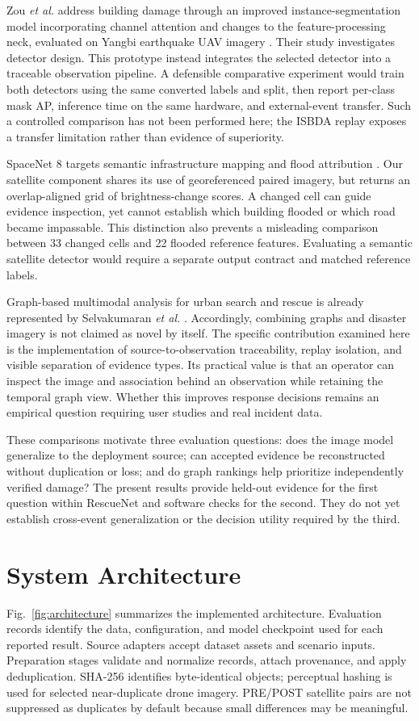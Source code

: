 \documentclass[conference]{IEEEtran}
\newcommand{\changed}[1]{{\color{blue}#1}}
\newcommand{\changed}[1]{#1}
\begin{document}
\changed{Zou \emph{et al.} address building damage through an improved instance-segmentation model incorporating channel attention and changes to the feature-processing neck, evaluated on Yangbi earthquake UAV imagery \cite{zou}. Their study investigates detector design. This prototype instead integrates the selected detector into a traceable observation pipeline. A defensible comparative experiment would train both detectors using the same converted labels and split, then report per-class mask AP, inference time on the same hardware, and external-event transfer. Such a controlled comparison has not been performed here; the ISBDA replay exposes a transfer limitation rather than evidence of superiority.}

\changed{SpaceNet 8 targets semantic infrastructure mapping and flood attribution \cite{spacenet}. Our satellite component shares its use of georeferenced paired imagery, but returns an overlap-aligned grid of brightness-change scores. A changed cell can guide evidence inspection, yet cannot establish which building flooded or which road became impassable. This distinction also prevents a misleading comparison between 33 changed cells and 22 flooded reference features. Evaluating a semantic satellite detector would require a separate output contract and matched reference labels.}

\changed{Graph-based multimodal analysis for urban search and rescue is already represented by Selvakumaran \emph{et al.} \cite{selva}. Accordingly, combining graphs and disaster imagery is not claimed as novel by itself. The specific contribution examined here is the implementation of source-to-observation traceability, replay isolation, and visible separation of evidence types. Its practical value is that an operator can inspect the image and association behind an observation while retaining the temporal graph view. Whether this improves response decisions remains an empirical question requiring user studies and real incident data.}

\changed{These comparisons motivate three evaluation questions: does the image model generalize to the deployment source; can accepted evidence be reconstructed without duplication or loss; and do graph rankings help prioritize independently verified damage? The present results provide held-out evidence for the first question within RescueNet and software checks for the second. They do not yet establish cross-event generalization or the decision utility required by the third.}

\section{System Architecture}
\changed{Fig.~\ref{fig:architecture} summarizes the implemented architecture. Evaluation records identify the data, configuration, and model checkpoint used for each reported result.} Source adapters accept dataset assets and scenario inputs. Preparation stages validate and normalize records, attach provenance, and apply deduplication. SHA-256 identifies byte-identical objects; perceptual hashing is used for selected near-duplicate drone imagery. PRE/POST satellite pairs are not suppressed as duplicates by default because small differences may be meaningful.
\end{document}
